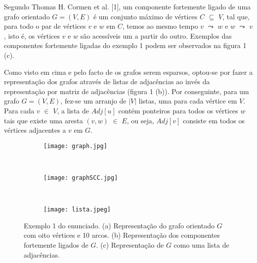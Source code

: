 \documentclass[12pt]{article}
\begin{document}
Segundo Thomas H. Cormen et al. [1], um componente fortemente ligado de uma grafo orientado $G=(V,E)$ é um conjunto máximo de vértices $C$ $\subseteq$ $V$, tal que, para todo o par de vértices $v$ e $w$ em $C$, temos ao mesmo tempo $v$ $\leadsto$ $w$ e $w$ $\leadsto$ $v$, isto é, os vértices $v$ e $w$ são acessíveis um a partir do outro. Exemplos das componentes fortemente ligadas do exemplo 1 podem ser observados na figura 1 (c).

Como visto em cima e pelo facto de os grafos serem esparsos, optou-se por fazer a representação dos grafos através de listas de adjacências ao invés da representação por matriz de adjacências (figura 1 (b)). Por conseguinte, para um grafo $G=(V,E)$, fez-se um arranjo de $|V|$ listas, uma para cada vértice em $V$. Para cada $v$ $\in$ $V$, a lista de $Adj[u]$ contém ponteiros para todos os vértices $w$ tais que existe uma aresta $(v,w)$ $\in$ $E$, ou seja, $Adj[v]$ consiste em todos os vértices adjacentes a $v$ em $G$.

\begin{figure}[hbt]
        \centering
        \begin{subfigure}[b]{0.28\textwidth}
                \texttt{[image: graph.jpg]}
                \caption{}
                \label{fig:graph}
        \end{subfigure}%
        ~ %
        \begin{subfigure}[b]{0.28\textwidth}
                \texttt{[image: graphSCC.jpg]}
                \caption{}
                \label{fig:graphSCC}
        \end{subfigure}
        ~ %
        \begin{subfigure}[b]{0.28\textwidth}
                \texttt{[image: lista.jpeg]}
                \caption{}
                \label{fig:lista}
        \end{subfigure}
        \caption{Exemplo 1 do enunciado. (a) Representação do grafo orientado $G$ com oito vértices e 10 arcos. (b) Representação dos componentes fortemente ligados de $G$. (c) Representação de $G$ como uma lista de adjacências.}\label{fig:grafos}
\end{figure}
\end{document}
